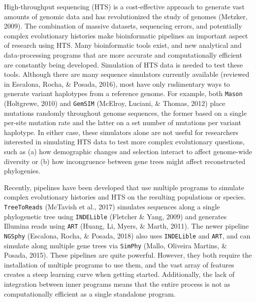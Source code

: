 \documentclass[12pt,]{article}
\begin{document}
High-throughput sequencing (HTS) is a cost-effective approach to generate vast amounts
of genomic data and has revolutionized the study of genomes
(Metzker, 2009).
The combination of massive datasets, sequencing errors, and potentially complex
evolutionary histories make bioinformatic pipelines an important aspect of
research using HTS.
Many bioinformatic tools exist, and new analytical and data-processing programs
that are more accurate and computationally efficient are constantly being developed.
Simulation of HTS data is needed to test these tools.
Although there are many sequence simulators currently available
(reviewed in Escalona, Rocha, \& Posada, 2016),
most have only rudimentary ways to generate variant haplotypes from a reference genome.
For example, both \texttt{Mason} (Holtgrewe, 2010) and \texttt{GemSIM} (McElroy, Luciani, \& Thomas, 2012) place mutations
randomly throughout genome sequences, the former based on a single per-site mutation rate
and the latter on a set number of mutations per variant haplotype.
In either case, these simulators alone are not useful for researchers interested
in simulating HTS data to test more complex evolutionary questions, such as
(a) how demographic changes and selection interact to affect genome-wide diversity or
(b) how incongruence between gene trees might affect reconstructed phylogenies.

Recently, pipelines have been developed that use multiple programs
to simulate complex evolutionary histories and HTS on the resulting populations
or species.
\texttt{TreeToReads} (McTavish et al., 2017) simulates sequences along a single
phylogenetic tree using \texttt{INDELible} (Fletcher \& Yang, 2009)
and generates Illumina reads using \texttt{ART} (Huang, Li, Myers, \& Marth, 2011).
The newer pipeline \texttt{NGSphy} (Escalona, Rocha, \& Posada, 2018) also uses \texttt{INDELible} and \texttt{ART}, and
can simulate along multiple gene trees via \texttt{SimPhy} (Mallo, Oliveira Martins, \& Posada, 2015).
These pipelines are quite powerful.
However, they both require the installation of multiple programs to use them,
and the vast array of features creates a steep learning curve when getting started.
Additionally, the lack of integration between inner programs means that the
entire process is not as computationally efficient as a single standalone program.
\end{document}
